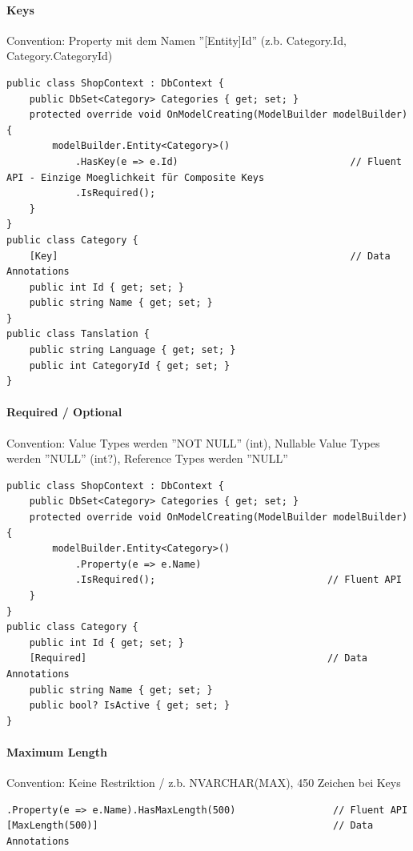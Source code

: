 \documentclass[
a4paper,
oneside,
10pt,
fleqn,
headsepline,
toc=listofnumbered, 
bibliography=totocnumbered]{scrartcl}
\begin{document}
\paragraph{Keys}
Convention: Property mit dem Namen ''[Entity]Id'' (z.b. Category.Id, Category.CategoryId)
\begin{lstlisting}
public class ShopContext : DbContext {
    public DbSet<Category> Categories { get; set; }
    protected override void OnModelCreating(ModelBuilder modelBuilder) {
        modelBuilder.Entity<Category>()
            .HasKey(e => e.Id)                              // Fluent API - Einzige Moeglichkeit für Composite Keys
            .IsRequired();
    }
}
public class Category {
    [Key]                                                   // Data Annotations
    public int Id { get; set; }
    public string Name { get; set; }
}
public class Tanslation {
    public string Language { get; set; }
    public int CategoryId { get; set; }
}
\end{lstlisting}

\paragraph{Required / Optional}
Convention: Value Types werden ''NOT NULL'' (int), Nullable Value Types werden ''NULL'' (int?), Reference Types werden ''NULL''
\begin{lstlisting}
public class ShopContext : DbContext {
    public DbSet<Category> Categories { get; set; }
    protected override void OnModelCreating(ModelBuilder modelBuilder) {
        modelBuilder.Entity<Category>()
            .Property(e => e.Name)
            .IsRequired();                              // Fluent API
    }
}
public class Category {
    public int Id { get; set; }
    [Required]                                          // Data Annotations
    public string Name { get; set; }
    public bool? IsActive { get; set; }
}
\end{lstlisting}

\paragraph{Maximum Length}
Convention: Keine Restriktion / z.b. NVARCHAR(MAX), 450 Zeichen bei Keys
\begin{lstlisting}
.Property(e => e.Name).HasMaxLength(500)                 // Fluent API
[MaxLength(500)]                                         // Data Annotations
\end{lstlisting}
\end{document}
